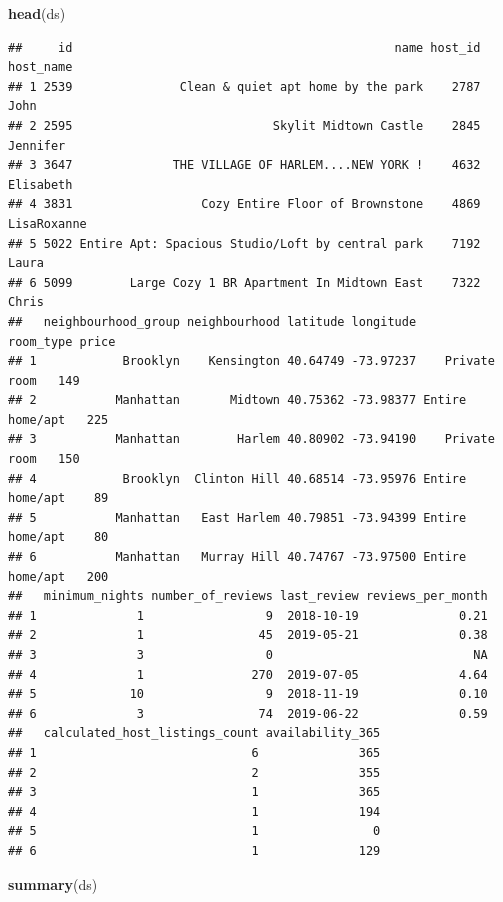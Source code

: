 \documentclass[
]{article}
\newenvironment{Shaded}{\begin{snugshade}}{\end{snugshade}}
\newcommand{\KeywordTok}[1]{\textcolor[rgb]{0.13,0.29,0.53}{\textbf{#1}}}
\newcommand{\NormalTok}[1]{#1}
\begin{document}
\begin{Shaded}
\begin{Highlighting}[]
\KeywordTok{head}\NormalTok{(ds)}
\end{Highlighting}
\end{Shaded}

\begin{verbatim}
##     id                                             name host_id   host_name
## 1 2539               Clean & quiet apt home by the park    2787        John
## 2 2595                            Skylit Midtown Castle    2845    Jennifer
## 3 3647              THE VILLAGE OF HARLEM....NEW YORK !    4632   Elisabeth
## 4 3831                  Cozy Entire Floor of Brownstone    4869 LisaRoxanne
## 5 5022 Entire Apt: Spacious Studio/Loft by central park    7192       Laura
## 6 5099        Large Cozy 1 BR Apartment In Midtown East    7322       Chris
##   neighbourhood_group neighbourhood latitude longitude       room_type price
## 1            Brooklyn    Kensington 40.64749 -73.97237    Private room   149
## 2           Manhattan       Midtown 40.75362 -73.98377 Entire home/apt   225
## 3           Manhattan        Harlem 40.80902 -73.94190    Private room   150
## 4            Brooklyn  Clinton Hill 40.68514 -73.95976 Entire home/apt    89
## 5           Manhattan   East Harlem 40.79851 -73.94399 Entire home/apt    80
## 6           Manhattan   Murray Hill 40.74767 -73.97500 Entire home/apt   200
##   minimum_nights number_of_reviews last_review reviews_per_month
## 1              1                 9  2018-10-19              0.21
## 2              1                45  2019-05-21              0.38
## 3              3                 0                            NA
## 4              1               270  2019-07-05              4.64
## 5             10                 9  2018-11-19              0.10
## 6              3                74  2019-06-22              0.59
##   calculated_host_listings_count availability_365
## 1                              6              365
## 2                              2              355
## 3                              1              365
## 4                              1              194
## 5                              1                0
## 6                              1              129
\end{verbatim}

\begin{Shaded}
\begin{Highlighting}[]
\KeywordTok{summary}\NormalTok{(ds)}
\end{Highlighting}
\end{Shaded}
\end{document}

